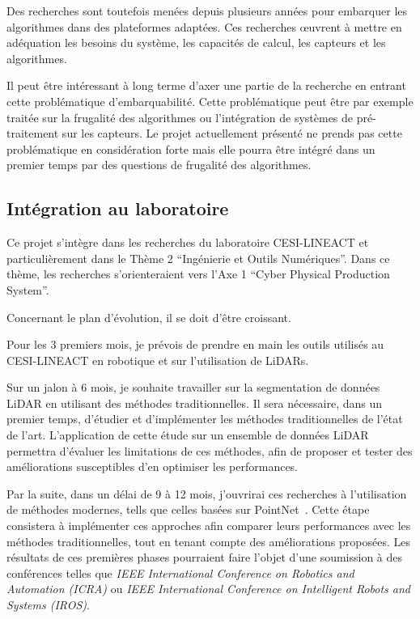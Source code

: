 \documentclass[a4paper, french, 10pt, onecolumn, notitlepage, roman]{article}
\begin{document}
Des recherches sont toutefois menées depuis plusieurs années pour embarquer les algorithmes dans des plateformes adaptées.
Ces recherches œuvrent à mettre en adéquation les besoins du système, les capacités de calcul, les capteurs et les algorithmes.

Il peut être intéressant à long terme d'axer une partie de la recherche en entrant cette problématique d'embarquabilité.
Cette problématique peut être par exemple traitée sur la frugalité des algorithmes ou l'intégration de systèmes de pré-traitement sur les capteurs.
Le projet actuellement présenté ne prends pas cette problématique en considération forte mais elle pourra être intégré dans un premier temps par des questions de frugalité des algorithmes.

\subsection{Intégration au laboratoire}

Ce projet s'intègre dans les recherches du laboratoire CESI-LINEACT et particulièrement dans le Thème 2 ``Ingénierie et Outils Numériques''.
Dans ce thème, les recherches s'orienteraient vers l'Axe 1 ``Cyber Physical Production System''.

Concernant le plan d'évolution, il se doit d'être croissant.

Pour les $3$ premiers mois, je prévois de prendre en main les outils utilisés au CESI-LINEACT en robotique et sur l'utilisation de LiDARs.

Sur un jalon à 6 mois, je souhaite travailler sur la segmentation de données LiDAR en utilisant des méthodes traditionnelles.
Il sera nécessaire, dans un premier temps, d'étudier et d'implémenter les méthodes traditionnelles de l'état de l'art.
L'application de cette étude sur un ensemble de données LiDAR permettra d'évaluer les limitations de ces méthodes, afin de proposer et tester des améliorations susceptibles d'en optimiser les performances.

Par la suite, dans un délai de 9 à 12 mois, j'ouvrirai ces recherches à l'utilisation de méthodes modernes, tells que celles basées sur PointNet~\cite{qi:cvpr:2017}.
Cette étape consistera à implémenter ces approches afin comparer leurs performances avec les méthodes traditionnelles, tout en tenant compte des améliorations proposées.
Les résultats de ces premières phases pourraient faire l'objet d'une soumission à des conférences telles que \emph{IEEE International Conference on Robotics and Automation (ICRA)} ou \emph{IEEE International Conference on Intelligent Robots and Systems (IROS)}.
\end{document}
